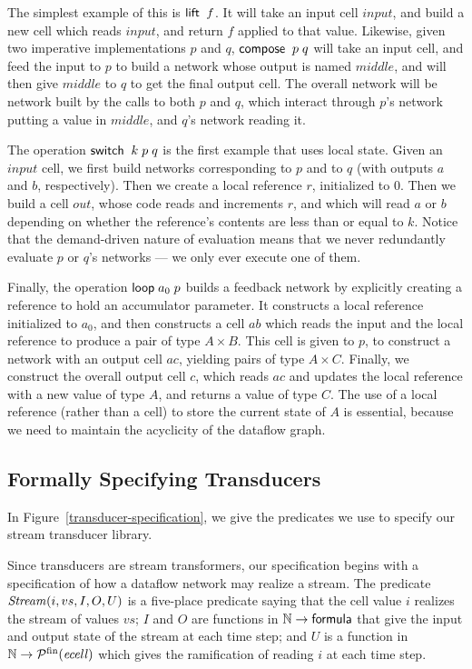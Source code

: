 The simplest example of this is $\mathsf{lift}\;\;f$. It will take an input
cell $input$, and build a new cell which reads $input$, and return $f$
applied to that value. Likewise, given two imperative implementations $p$
and $q$, $\mathsf{compose}\;\;p\;q$ will take an input cell, and feed the
input to $p$ to build a network whose output is named $middle$, and
will then give $middle$ to $q$ to get the final output cell. The
overall network will be network built by the calls to both $p$ and
$q$, which interact through $p$'s network putting a value in $middle$,
and $q$'s network reading it.

The operation $\mathsf{switch}\;\;k\;p\;q$ is the first example that uses 
local state. Given an $input$ cell, we first build networks corresponding
to $p$ and to $q$ (with outputs $a$ and $b$, respectively). Then we
create a local reference $r$, initialized to $0$. Then we build a cell $out$,
whose code reads and increments $r$, and which will read $a$ or $b$ depending
on whether the reference's contents are less than or equal to $k$. Notice
that the demand-driven nature of evaluation means that we never redundantly
evaluate $p$ or $q$'s networks --- we only ever execute one of them. 

Finally, the operation $\mathsf{loop}\; a_0\;p$ builds a feedback network by
explicitly creating a reference to hold an accumulator parameter. It
constructs a local reference initialized to $a_0$, and then constructs
a cell $ab$ which reads the input and the local reference to produce a
pair of type $A \times B$. This cell is given to $p$, to construct a
network with an output cell $ac$, yielding pairs of type $A \times
C$. Finally, we construct the overall output cell $c$, which reads
$ac$ and updates the local reference with a new value of type $A$, and
returns a value of type $C$. The use of a local reference (rather than
a cell) to store the current state of $A$ is essential, because we need
to maintain the acyclicity of the dataflow graph. 

\subsection{Formally Specifying Transducers}

In Figure~\ref{transducer-specification}, we give the predicates we
use to specify our stream transducer library. 

Since transducers are stream transformers, our specification begins
with a specification of how a dataflow network may realize a
stream. The predicate $\mathit{Stream}(i, vs, I, O, U)$ is a five-place
predicate saying that the cell value $i$ realizes the stream of values
$vs$; $I$ and $O$ are functions in $\mathbb{N} \to \mathsf{formula}$ that give the
input and output state of the stream at each time step; and $U$ is a
function in $\mathbb{N} \to \mathcal{P}^{\mathrm{fin}}(\mathit{ecell})$ which gives the ramification
of reading $i$ at each time step.


